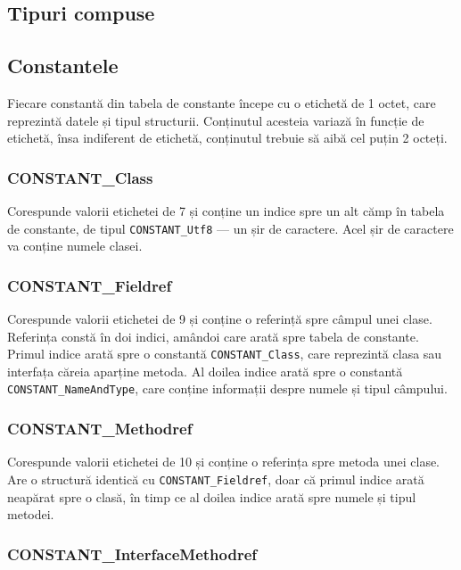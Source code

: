 \subsection{Tipuri compuse}

\subsection{Constantele}

Fiecare constantă din tabela de constante începe cu o etichetă de 1
octet, care reprezintă datele și tipul structurii. Conținutul acesteia
variază în funcție de etichetă, însa indiferent de etichetă, conținutul
trebuie să aibă cel puțin 2 octeți.

\subsubsection{CONSTANT\_Class}

Corespunde valorii etichetei de 7 și conține un indice spre un alt cămp
în tabela de constante, de tipul \texttt{CONSTANT\_Utf8} --- un șir de
caractere. Acel șir de caractere va conține numele clasei.

\subsubsection{CONSTANT\_Fieldref}

Corespunde valorii etichetei de 9 și conține o referință spre câmpul
unei clase. Referința constă în doi indici, amândoi care arată spre
tabela de constante. Primul indice arată spre o constantă
\texttt{CONSTANT\_Class}, care reprezintă clasa sau interfața căreia
aparține metoda. Al doilea indice arată spre o constantă
\texttt{CONSTANT\_NameAndType}, care conține informații despre numele și
tipul câmpului.

\subsubsection{CONSTANT\_Methodref}

Corespunde valorii etichetei de 10 și conține o referința spre metoda
unei clase. Are o structură identică cu \texttt{CONSTANT\_Fieldref},
doar că primul indice arată neapărat spre o clasă, în timp ce al doilea
indice arată spre numele și tipul metodei.

\subsubsection{CONSTANT\_InterfaceMethodref}

